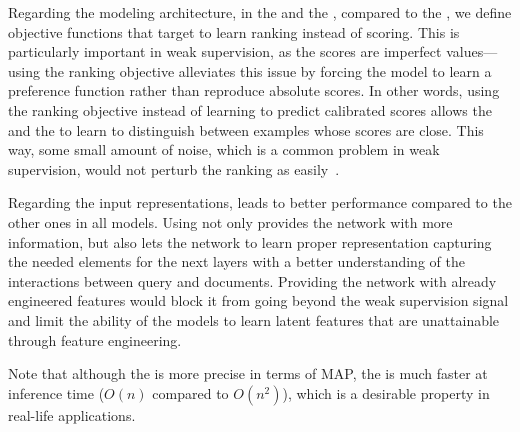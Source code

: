Regarding the modeling architecture, in the \modeltwo and the \modelthree, compared to the \modelone, we define objective functions that target to learn ranking instead of scoring. This is particularly important in weak supervision, as the scores are imperfect values---using the ranking objective alleviates this issue by forcing the model to learn a preference function rather than reproduce absolute scores.
%
In other words, using the ranking objective instead of learning to predict calibrated scores allows the \modeltwo and the \modelthree to learn to distinguish between examples whose scores are close. This way, some small amount of noise, which is a common problem in weak supervision, would not perturb the ranking as easily~\citep{Zamani:2018:ictir}.

Regarding the input representations, \feedthree leads to better performance compared to the other ones in all models.
Using \feedthree not only provides the network with more information, but also lets the network to learn proper representation capturing the needed elements for the next layers with a better understanding of the interactions between query and documents. 
Providing the network with already engineered features would block it from going beyond the weak supervision signal and limit the ability of the models to learn latent features that are unattainable through feature engineering. 

Note that although the \modelthree is more precise in terms of MAP, the \modeltwo is much faster at inference time ($O(n)$ compared to $O(n^2)$), which is a desirable property in real-life applications.


